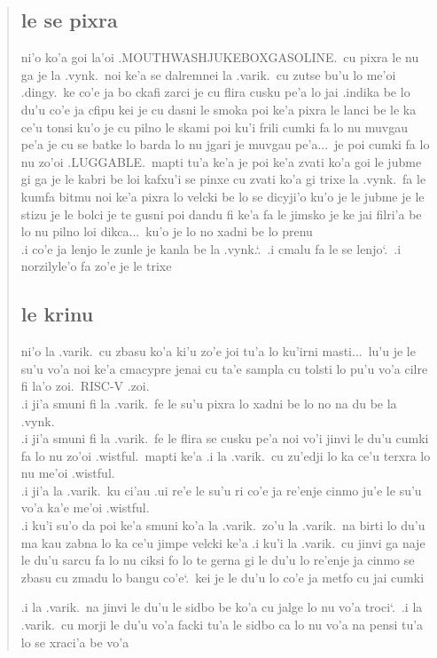 \documentclass{report}
\newcommand\sds{\spacefactor\sfcode`.\ \space}
\begin{document}
\begin{quote}
	\subsection{le se pixra}
	ni'o ko'a goi la'oi .MOUTHWASHJUKEBOXGASOLINE.\ cu pixra le nu ga je la .vynk.\ noi ke'a se dalremnei la .varik.\ cu zutse bu'u lo me'oi .dingy.\ ke co'e ja bo ckafi zarci je cu flira cusku pe'a lo jai .indika be lo du'u co'e ja cfipu kei je cu dasni le smoka poi ke'a pixra le lanci be le ka ce'u tonsi ku'o je cu pilno le skami poi ku'i frili cumki fa lo nu muvgau pe'a je cu se batke lo barda lo nu jgari je muvgau pe'a...\ je poi cumki fa lo nu zo'oi .LUGGABLE.\ mapti tu'a ke'a je poi ke'a zvati ko'a goi le jubme gi ga je le kabri be loi kafxu'i se pinxe cu zvati ko'a gi trixe la .vynk.\ fa le kumfa bitmu noi ke'a pixra lo velcki be lo se dicyji'o ku'o je le jubme je le stizu je le bolci je te gusni poi dandu fi ke'a fa le jimsko je ke jai filri'a be lo nu pilno loi dikca...\ ku'o je lo no xadni be lo prenu\\
	.i co'e ja lenjo le zunle je kanla be la .vynk.\sds  .i cmalu fa le se lenjo\sds  .i norzilyle'o fa zo'e je le trixe

	\subsection{le krinu}
	ni'o la .varik.\ cu zbasu ko'a ki'u zo'e joi tu'a lo ku'irni masti...\ lu'u je le su'u vo'a noi ke'a cmacypre jenai cu ta'e sampla cu tolsti lo pu'u vo'a cilre fi la'o zoi.\ RISC-V .zoi.\\
	.i ji'a smuni fi la .varik.\ fe le su'u pixra lo xadni be lo no na du be la .vynk.\\
	.i ji'a smuni fi la .varik.\ fe le flira se cusku pe'a noi vo'i jinvi le du'u cumki fa lo nu zo'oi .wistful.\ mapti ke'a  .i la .varik.\ cu zu'edji lo ka ce'u terxra lo nu me'oi .wistful.\\
	.i ji'a la .varik.\ ku ci'au .ui re'e le su'u ri co'e ja re'enje cinmo ju'e le su'u vo'a ka'e me'oi .wistful.\\
	.i ku'i su'o da poi ke'a smuni ko'a la .varik.\ zo'u la .varik.\ na birti lo du'u ma kau zabna lo ka ce'u jimpe velcki ke'a  .i ku'i la .varik.\ cu jinvi ga naje le du'u sarcu fa lo nu ciksi fo lo te gerna gi le du'u lo re'enje ja cinmo se zbasu cu zmadu lo bangu co'e\sds kei je le du'u lo co'e ja metfo cu jai cumki

	.i la .varik.\ na jinvi le du'u le sidbo be ko'a cu jalge lo nu vo'a troci\sds  .i la .varik.\ cu morji le du'u vo'a facki tu'a le sidbo ca lo nu vo'a na pensi tu'a lo se xraci'a be vo'a


\end{quote}
\end{document}
